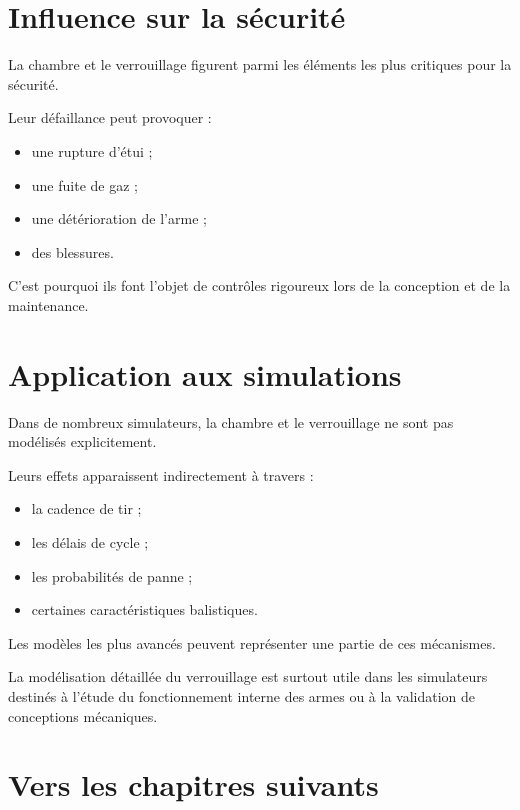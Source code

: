 \section{Influence sur la sécurité}

La chambre et le verrouillage figurent parmi les éléments les plus critiques
pour la sécurité.

Leur défaillance peut provoquer :

\begin{itemize}
    \item une rupture d'étui ;
    \item une fuite de gaz ;
    \item une détérioration de l'arme ;
    \item des blessures.
\end{itemize}

C'est pourquoi ils font l'objet de contrôles rigoureux lors de la
conception et de la maintenance.

\section{Application aux simulations}

Dans de nombreux simulateurs, la chambre et le verrouillage ne sont pas
modélisés explicitement.

Leurs effets apparaissent indirectement à travers :

\begin{itemize}
    \item la cadence de tir ;
    \item les délais de cycle ;
    \item les probabilités de panne ;
    \item certaines caractéristiques balistiques.
\end{itemize}

Les modèles les plus avancés peuvent représenter une partie de ces
mécanismes.

\begin{simulation}

La modélisation détaillée du verrouillage est surtout utile dans les
simulateurs destinés à l'étude du fonctionnement interne des armes ou à la
validation de conceptions mécaniques.

\end{simulation}

\section{Vers les chapitres suivants}

